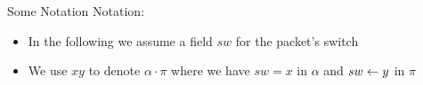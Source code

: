 \begin{frame}{Some Notation}
    Notation:
    \begin{itemize}
        \item In the following we assume a field $sw$ for the
        packet's switch
        \item We use $xy$ to denote $\alpha\cdot\pi$ where
            we have $sw = x$ in $\alpha$ and 
            $sw \leftarrow y$ in $\pi$

    \end{itemize}
\end{frame}